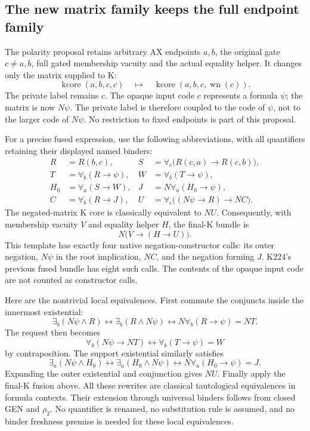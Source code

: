 \subsection{The new matrix family keeps the full endpoint family}

The polarity proposal retains arbitrary AX endpoints $a,b$, the original
gate $c\ne a,b$, full gated membership vacuity and the actual equality
helper.  It changes only the matrix supplied to K:
\[
 \operatorname{kcore}(a,b,c,c)
 \quad\longmapsto\quad
 \operatorname{kcore}(a,b,c,\operatorname{wn}(c)).
\]
The private label remains $c$.  The opaque input code $c$ represents a
formula $\psi$; the matrix is now $N\psi$.  The private label is therefore
coupled to the code of $\psi$, not to the larger code of $N\psi$.
No restriction to fixed endpoints is part of this proposal.

For a precise fused expression, use the following abbreviations, with
all quantifiers retaining their displayed named binders:
\begin{align*}
 R&=R(b,c),&
 S&=\forall_c\bigl(R(c,a)\to R(c,b)\bigr),\\
 T&=\forall_b(R\to\psi),&
 W&=\forall_b(T\to\psi),\\
 H_0&=\forall_a(S\to W),&
 J&=N\forall_a(H_0\to\psi),\\
 C&=\forall_b(R\to J),&
 U&=\forall_c\bigl((N\psi\to R)\to N C\bigr).
\end{align*}
The negated-matrix K core is classically equivalent to $N U$.
Consequently, with membership vacuity $V$ and equality helper $H$, the
final-K bundle is
\begin{equation}\label{eq:polarity-bundle}
       N\bigl(V\to(H\to U)\bigr).
\end{equation}
This template has exactly four native negation-constructor calls: its
outer negation, $N\psi$ in the root implication, $N C$, and the negation
forming $J$.  K224's previous fused bundle has eight such calls.  The
contents of the opaque input code are not counted as constructor calls.

Here are the nontrivial local equivalences.  First commute the conjuncts
inside the innermost existential:
\[
 \exists_b(N\psi\wedge R)
 \leftrightarrow \exists_b(R\wedge N\psi)
 \leftrightarrow N\forall_b(R\to\psi)=N T.
\]
The request then becomes
\[
 \forall_b(N\psi\to N T)
 \leftrightarrow\forall_b(T\to\psi)=W
\]
by contraposition.  The support existential similarly satisfies
\[
 \exists_a(N\psi\wedge H_0)
 \leftrightarrow\exists_a(H_0\wedge N\psi)
 \leftrightarrow N\forall_a(H_0\to\psi)=J.
\]
Expanding the outer existential and conjunction gives $N U$.
Finally apply the final-K fusion above.  All these rewrites are classical
tautological equivalences in formula contexts.  Their extension through
universal binders follows from closed GEN and $\rho_2$.  No quantifier is
renamed, no substitution rule is assumed, and no binder freshness premise
is needed for these local equivalences.

